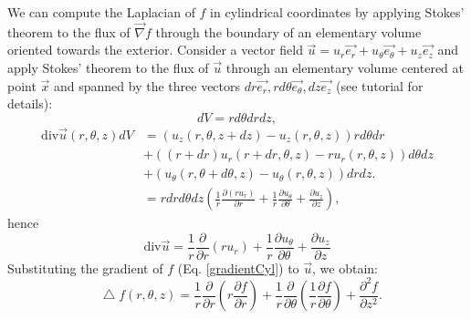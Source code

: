 \documentclass[DIV=12]{article}
\newcommand*\Laplace{\mathop{}\!\mathbin\bigtriangleup}
\newcommand{\etheta}{\vec{e_\theta}}
\newcommand{\er}{\vec{e_r}}
\newcommand{\ez}{\vec{e_z}}
\begin{document}
We can compute the Laplacian of $f$ in cylindrical coordinates by applying  Stokes' theorem to the 
 flux of $\vec{\nabla} f$ through the boundary of an elementary volume oriented towards the exterior.
 Consider a vector field $\vec{u}= u_r \er + u_\theta \etheta + u_z \ez$ and apply Stokes' theorem to the flux of $\vec{u}$
 through an elementary volume centered at point $\vec{x}$ and spanned by the three vectors $dr \er, rd\theta \etheta, dz \ez$ (see tutorial
 for details):
\begin{equation}
dV = rd\theta dr dz,
\end{equation}
\begin{equation}
  \begin{array}{ll}  
{\mathrm{div}} \vec{u} (r,\theta, z )dV &= (u_z(r,\theta, z + dz) - u_z( r,\theta,z) )rd\theta dr\\
 & + ( (r+dr)u_r(r+dr, \theta,z) - ru_r(r,\theta,z))d\theta dz \\
 &+ ( u_\theta( r,\theta + d\theta, z) - u_\theta( r,\theta, z ) )dr dz.\\
 &= r dr d\theta dz\left(  \frac{1}{r}\frac{\partial( r u_r)}{\partial r} + \frac{1}{r} \frac{\partial u_\theta}{\partial \theta} + \frac{\partial u_z}{\partial z}\right),
 \end{array}
\label{divEquation}
\end{equation}
hence 
\begin{equation}
\boxed{
 {\mathrm{div}} \vec{u}  = \frac{1}{r}\frac{\partial}{\partial r}\left( ru_r\right)+ \frac{1}{r}\frac{\partial u_\theta}{\partial \theta}  + \frac{\partial  u_z}{\partial z}}
\end{equation}
Substituting the gradient of $f$ (Eq. \ref{gradientCyl}) to $\vec{u}$, we obtain:
\begin{equation}
\boxed{
 \Laplace f  (r,\theta, z )= \frac{1}{r}\frac{\partial}{\partial r}\left( r\frac{\partial f}{\partial r}\right)+ \frac{1}{r}\frac{\partial}{\partial \theta} \left( \frac{1}{r} 
\frac{\partial f}{\partial \theta}\right) + \frac{\partial ^2 f}{\partial z^2}.}
\label{LaplacianCyl}
\end{equation}
\end{document}
